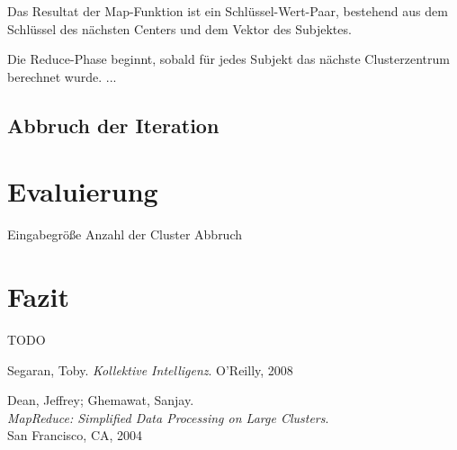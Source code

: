 \documentclass[a4paper]{llncs}
\begin{document}
Das Resultat der Map-Funktion ist ein Schlüssel-Wert-Paar, bestehend aus dem Schlüssel des nächsten Centers und dem Vektor des Subjektes.

Die Reduce-Phase beginnt, sobald für jedes Subjekt das nächste Clusterzentrum berechnet wurde. ...

\subsection{Abbruch der Iteration}

\section{Evaluierung}
Eingabegröße
Anzahl der Cluster
Abbruch

\section{Fazit}
TODO

\begin{thebibliography}{------------}

  Segaran, Toby.
  {\em Kollektive Intelligenz}.
  O'Reilly, 2008

  Dean, Jeffrey; Ghemawat, Sanjay.\\
  {\em MapReduce: Simplified Data Processing on Large Clusters}.\\
  San Francisco, CA, 2004
   
\end{thebibliography}
\end{document}
